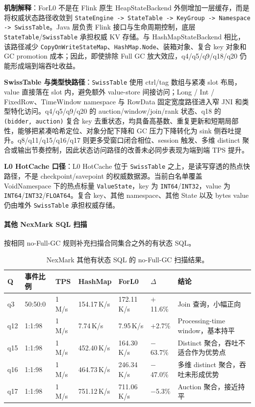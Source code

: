 \documentclass[a4paper,11pt]{article}
\begin{document}
\textbf{机制解释}：ForL0 不是在 Flink 原生 HeapStateBackend 外侧增加一层缓存，而是将权威状态路径收敛到 \texttt{StateEngine -> StateTable -> KeyGroup -> Namespace -> SwissTable}。Java 层负责 Flink 接口与生命周期控制，底层 \texttt{StateTable}/\texttt{SwissTable} 承担权威 KV 存储。与 HashMapStateBackend 相比，该路径减少 \texttt{CopyOnWriteStateMap}、\texttt{HashMap.Node}、装箱对象、复合 key 对象和 GC promotion 成本；因此，即使排除 Full GC 放大效应，q4/q5/q9/q18/q20 仍能形成端到端吞吐收益。

\textbf{SwissTable 与类型快路径}：\texttt{SwissTable} 使用 ctrl/tag 数组与紧凑 slot 布局，value 直接落在 slot 内，避免额外 value-store 间接访问；Long / Int / FixedRow、TimeWindow namespace 与 RowData 固定宽度路径进入窄 JNI 和类型特化访问。q4/q5/q9/q20 的 auction/window/join/rank 状态、q18 的 \texttt{(bidder, auction)} 复合 key 去重状态，均具备高基数、重复更新和短期局部性，能够把紧凑哈希定位、对象分配下降和 GC 压力下降转化为 sink 侧吞吐提升。q8/q11/q15/q16/q17 则更多受窗口闭合相位、session 触发、多维 distinct 聚合或输出节奏控制，因此状态访问路径的改善未必同步表现为端到端 TPS 提升。

\textbf{L0 HotCache 口径}：L0 HotCache 位于 \texttt{SwissTable} 之上，是读写穿透的热点快路径，不是 checkpoint/savepoint 的权威数据源。当前白名单覆盖 VoidNamespace 下的热点标量 \texttt{ValueState}，key 为 \texttt{INT64}/\texttt{INT32}，value 为 \texttt{INT64}/\texttt{INT32}/\texttt{FLOAT64}。复合 key、其他 namespace、其他 State 以及 bytes value 仍由堆外 \texttt{SwissTable} 承担权威存储。

\paragraph{其他 NexMark SQL 扫描}
按相同 no-Full-GC 规则补充扫描合同集合之外的有状态 SQL。

\begin{table}[H]
\centering
\scriptsize
\setlength{\tabcolsep}{3pt}
\begin{tabularx}{\textwidth}{C{0.65cm} C{1.2cm} R{0.9cm} R{1.4cm} R{1.4cm} R{1.1cm} X}
\toprule
\textbf{Q} & \textbf{事件比例} & \textbf{TPS} & \textbf{HashMap} & \textbf{ForL0} & $\Delta$ & \textbf{结论} \\
\midrule
q3  & 50:50:0 & 1\,M/s & 154.17\,K/s & 172.11\,K/s & $+$11.6\% & Join 查询，小幅正向 \\
q12 & 1:1:98  & 1\,M/s & 7.74\,K/s   & 7.95\,K/s   & $+$2.7\%  & Processing-time window，基本持平 \\
q15 & 1:1:98  & 1\,M/s & 452.40\,K/s & 164.30\,K/s & $-$63.7\% & Distinct 聚合，吞吐不适合作为优势点 \\
q16 & 1:1:98  & 1\,M/s & 464.73\,K/s & 246.34\,K/s & $-$47.0\% & 多维 distinct 聚合，吞吐未形成优势 \\
q17 & 1:1:98  & 1\,M/s & 751.12\,K/s & 711.06\,K/s & $-$5.3\%  & Auction 聚合，接近持平 \\
\bottomrule
\end{tabularx}
\caption{NexMark 其他有状态 SQL 的 no-Full-GC 扫描结果。}
\label{tab:nexmark-extra-sql}
\end{table}
\end{document}
